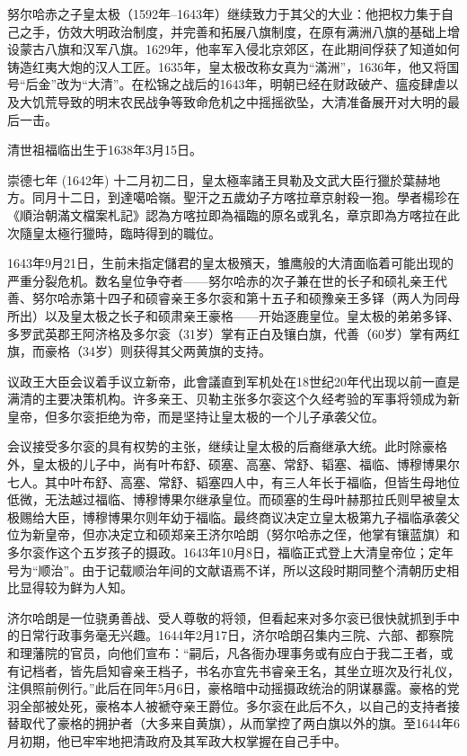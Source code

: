 努尔哈赤之子皇太极（1592年–1643年）继续致力于其父的大业：他把权力集于自己之手，仿效大明政治制度，并完善和拓展八旗制度，在原有满洲八旗的基础上增设蒙古八旗和汉军八旗。1629年，他率军入侵北京郊区，在此期间俘获了知道如何铸造红夷大炮的汉人工匠。1635年，皇太极改称女真为“滿洲”，1636年，他又将国号“后金”改为“大清”。在松锦之战后的1643年，明朝已经在财政破产、瘟疫肆虐以及大饥荒导致的明末农民战争等致命危机之中摇摇欲坠，大清准备展开对大明的最后一击。

清世祖福临出生于1638年3月15日。

崇德七年 (1642年) 十二月初二日，皇太極率諸王貝勒及文武大臣行獵於葉赫地方。同月十二日，到達噶哈嶺。聖汗之五歲幼子方喀拉章京射殺一狍。學者楊珍在《順治朝滿文檔案札記》認為方喀拉即為福臨的原名或乳名，章京即為方喀拉在此次隨皇太極行獵時，臨時得到的職位。

1643年9月21日，生前未指定儲君的皇太极殯天，雏鹰般的大清面临着可能出现的严重分裂危机。数名皇位争夺者——努尔哈赤的次子兼在世的长子和硕礼亲王代善、努尔哈赤第十四子和硕睿亲王多尔衮和第十五子和硕豫亲王多铎（两人为同母所出）以及皇太极之长子和硕肃亲王豪格——开始逐鹿皇位。皇太极的弟弟多铎、多罗武英郡王阿济格及多尔衮（31岁）掌有正白及镶白旗，代善（60岁）掌有两红旗，而豪格（34岁）则获得其父两黄旗的支持。

议政王大臣会议着手议立新帝，此會議直到军机处在18世纪20年代出现以前一直是满清的主要决策机构。许多亲王、贝勒主张多尔衮这个久经考验的军事将领成为新皇帝，但多尔衮拒绝为帝，而是坚持让皇太极的一个儿子承袭父位。

会议接受多尔衮的具有权势的主张，继续让皇太极的后裔继承大统。此时除豪格外，皇太极的儿子中，尚有叶布舒、硕塞、高塞、常舒、韬塞、福临、博穆博果尔七人。其中叶布舒、高塞、常舒、韬塞四人中，有三人年长于福临，但皆生母地位低微，无法越过福临、博穆博果尔继承皇位。而硕塞的生母叶赫那拉氏则早被皇太极赐给大臣，博穆博果尔则年幼于福临。最终商议决定立皇太极第九子福临承袭父位为新皇帝，但亦决定立和硕郑亲王济尔哈朗（努尔哈赤之侄，他掌有镶蓝旗）和多尔衮作这个五岁孩子的摄政。1643年10月8日，福临正式登上大清皇帝位；定年号为“顺治”。由于记载顺治年间的文献语焉不详，所以这段时期同整个清朝历史相比显得较为鲜为人知。

济尔哈朗是一位骁勇善战、受人尊敬的将领，但看起来对多尔衮已很快就抓到手中的日常行政事务毫无兴趣。1644年2月17日，济尔哈朗召集内三院、六部、都察院和理藩院的官员，向他们宣布：“嗣后，凡各衙办理事务或有应白于我二王者，或有记档者，皆先启知睿亲王档子，书名亦宜先书睿亲王名，其坐立班次及行礼仪，注俱照前例行。”此后在同年5月6日，豪格暗中动摇摄政统治的阴谋暴露。豪格的党羽全部被处死，豪格本人被褫夺亲王爵位。多尔衮在此后不久，以自己的支持者接替取代了豪格的拥护者（大多来自黄旗），从而掌控了两白旗以外的旗。至1644年6月初期，他已牢牢地把清政府及其军政大权掌握在自己手中。

